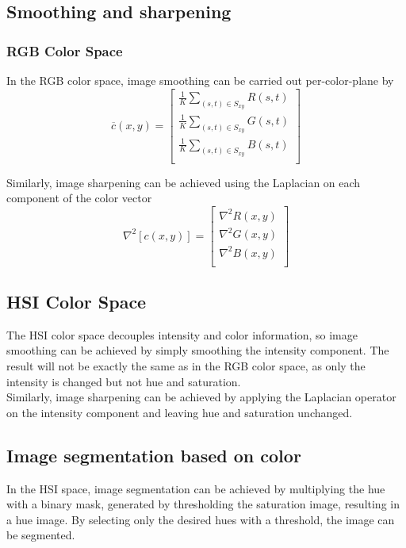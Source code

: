 \subsection{Smoothing and sharpening }
\subsubsection{RGB Color Space}
In the RGB color space, image smoothing can be carried out per-color-plane by
\begin{equation}
	\overline{c}(x,y) = \left[ \begin{array}{l}
		\frac{1}{K} \displaystyle\sum_{(s,t) \in S_{xy}} R(s,t) \\
		\frac{1}{K} \displaystyle\sum_{(s,t) \in S_{xy}} G(s,t) \\
		\frac{1}{K} \displaystyle\sum_{(s,t) \in S_{xy}} B(s,t) \\
	\end{array} \right]
\end{equation}

Similarly, image sharpening can be achieved using the Laplacian on each component of the color vector
\begin{equation}
	\nabla^2 \left[ c(x,y) \right] = \left[ \begin{array}{l}
		\nabla^2 R(x,y) \\
		\nabla^2 G(x,y) \\
		\nabla^2 B(x,y) \\
	\end{array} \right]
\end{equation}

\subsection{HSI Color Space}
The HSI color space decouples intensity and color information, so image smoothing can be achieved by simply smoothing the intensity component. The result will not be exactly the same as in the RGB color space, as only the intensity is changed but not hue and saturation. \\

Similarly, image sharpening can be achieved by applying the Laplacian operator on the intensity component and leaving hue and saturation unchanged.

\subsection{Image segmentation based on color }
In the HSI space, image segmentation can be achieved by multiplying the hue with a binary mask, generated by thresholding the saturation image, resulting in a hue image. By selecting only the desired hues with a threshold, the image can be segmented. \\

